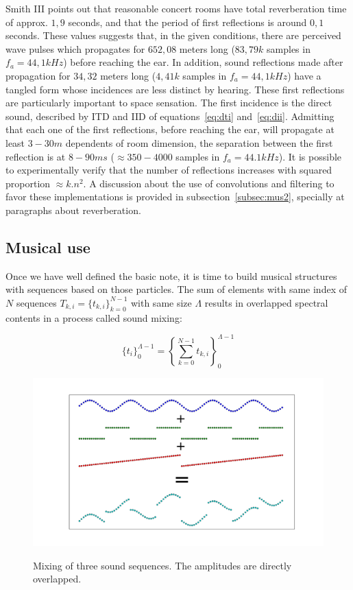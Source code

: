 \documentclass[
 aip,
 jmp,
 amsmath,amssymb,
 reprint,
]{revtex4-1}
\begin{document}
Smith III points out that reasonable concert rooms have total reverberation time of approx. $1,9$ seconds, and that the period of first reflections is around $0,1$ seconds. These values suggests that, in the given conditions, there are perceived wave pulses which propagates for $652,08$ meters long ($83,79k$ samples in $f_a=44,1kHz$) before reaching the ear. In addition, sound reflections made after propagation for $34,32$ meters long ($4,41k$ samples in $f_a=44,1kHz$) have a tangled form whose incidences are less distinct by hearing. These first reflections are particularly important to space sensation. The first incidence is the direct sound, described by ITD and IID of equations~\ref{eq:dti} and~\ref{eq:dii}. Admitting that each one of the first reflections, before reaching the ear, will propagate at least $3-30m$ dependents of room dimension, the separation between the first reflection is at  $8-90ms$ ($\approx 350-4000$ samples in $f_a=44.1kHz$). It is possible to experimentally verify that the number of reflections increases with squared proportion $\approx k.n^2$. A discussion about the use of convolutions and filtering to favor these implementations is provided in subsection~\ref{subsec:mus2}, specially at paragraphs about reverberation.

\subsection{Musical use}\label{subsec:basMus}

Once we have well defined the basic note, it is time to build musical structures with sequences based on those particles. The sum of elements with same index of $N$ sequences $T_{k,i}=\{t_{k,i}\}_{k=0}^{N-1}$ with same size $\Lambda$ results in overlapped spectral contents in a process called sound mixing:

\begin{equation}\label{eq:mixagem}
\{t_i\}_0^{\Lambda-1}=\left \{ \sum_{k=0}^{N-1}t_{k,i} \right \}_0^{\Lambda-1}
\end{equation}

\begin{figure}[h!]
    {\centering
        \includegraphics[width=\columnwidth]{figures/mixagem}}
    \caption{Mixing of three sound sequences. The amplitudes are directly overlapped.}
        \label{fig:mixagem}
\end{figure}
\end{document}
